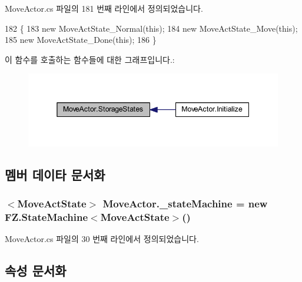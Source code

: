 Move\+Actor.\+cs 파일의 181 번째 라인에서 정의되었습니다.


\begin{DoxyCode}
182     \{
183         \textcolor{keyword}{new} MoveActState\_Normal(\textcolor{keyword}{this});
184         \textcolor{keyword}{new} MoveActState\_Move(\textcolor{keyword}{this});
185         \textcolor{keyword}{new} MoveActState\_Done(\textcolor{keyword}{this});
186     \}
\end{DoxyCode}


이 함수를 호출하는 함수들에 대한 그래프입니다.\+:\nopagebreak
\begin{figure}[H]
\begin{center}
\leavevmode
\includegraphics[width=345pt]{class_move_actor_a34b9e1ec5019892f38a8d5087bd5c2fe_icgraph}
\end{center}
\end{figure}




\subsection{멤버 데이타 문서화}
\subsubsection[{\texorpdfstring{\+\_\+state\+Machine}{_stateMachine}}]{$<${\bf Move\+Act\+State}$>$ Move\+Actor.\+\_\+state\+Machine = new {\bf F\+Z.\+State\+Machine}$<${\bf Move\+Act\+State}$>$()\hspace{0.3cm}{\ttfamily [private]}}\hypertarget{class_move_actor_a7680d49ed42369702af8a01c058caeb5}{}\label{class_move_actor_a7680d49ed42369702af8a01c058caeb5}


Move\+Actor.\+cs 파일의 30 번째 라인에서 정의되었습니다.



\subsection{속성 문서화}
